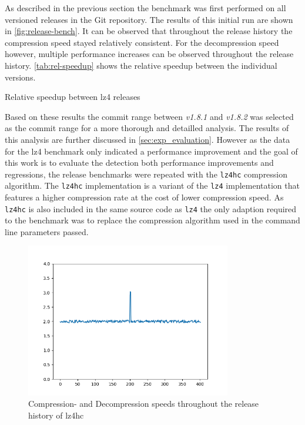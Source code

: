 \documentclass[	runningheads,
				a4paper]{llncs}
\begin{document}
	As described in the previous section the benchmark was first performed on all versioned releases in the Git repository. The results of this initial run are shown in \autoref{fig:release-bench}. It can be observed that throughout the release history the compression speed stayed relatively consistent. For the decompression speed however, multiple performance increases can be observed throughout the release history. \autoref{tab:rel-speedup} shows the relative speedup between the individual versions.

	\begin{table}
		\caption{Relative speedup between lz4 releases}
		\label{tab:rel-speedup}
	\end{table}

	Based on these results the commit range between \textit{v1.8.1} and \textit{v1.8.2} was selected as the commit range for a more thorough and detailled analysis. The results of this analysis are further discussed in \autoref{sec:exp_evaluation}. However as the data for the lz4 benchmark only indicated a performance improvement and the goal of this work is to evaluate the detection both performance improvements and regressions, the release benchmarks were repeated with the \texttt{lz4hc} compression algorithm. The \texttt{lz4hc} implementation is a variant of the \texttt{lz4} implementation that features a higher compression rate at the cost of lower compression speed. As \texttt{lz4hc} is also included in the same source code as \texttt{lz4} the only adaption required to the benchmark was to replace the compression algorithm used in the command line parameters passed.

	\begin{figure}[ht!]
		\centering
		\includegraphics[width=0.8\textwidth]{outlier}
		\caption{Compression- and Decompression speeds throughout the release history of lz4hc}
		\label{fig:release-bench}
	\end{figure}
\end{document}
